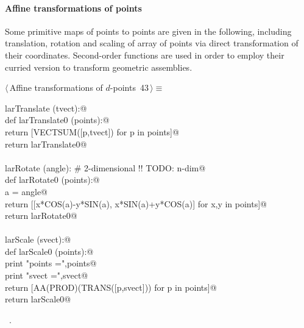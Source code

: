 \documentclass[11pt,oneside]{article}    %
\begin{document}
\paragraph{Affine transformations of points} Some primitive maps of points to points are given in the following, including translation, rotation and scaling of array of points via direct transformation of their coordinates. Second-order functions are used in order to employ their curried version to transform geometric assemblies.

\begin{flushleft} \small \label{scrap69}
\protect{}$\langle\,$Affine transformations of $d$-points\nobreak\ {\footnotesize 43}$\,\rangle\equiv$
\vspace{-1ex}
\begin{list}{}{} \item
\mbox{}\verb@def larTranslate (tvect):@\\
\mbox{}\verb@    def larTranslate0 (points):@\\
\mbox{}\verb@        return [VECTSUM([p,tvect]) for p in points]@\\
\mbox{}\verb@    return larTranslate0@\\
\mbox{}\verb@@\\
\mbox{}\verb@def larRotate (angle):        # 2-dimensional !! TODO: n-dim@\\
\mbox{}\verb@    def larRotate0 (points):@\\
\mbox{}\verb@        a = angle@\\
\mbox{}\verb@        return [[x*COS(a)-y*SIN(a), x*SIN(a)+y*COS(a)] for x,y in points]@\\
\mbox{}\verb@    return larRotate0@\\
\mbox{}\verb@@\\
\mbox{}\verb@def larScale (svect):@\\
\mbox{}\verb@    def larScale0 (points):@\\
\mbox{}\verb@        print "\n points =",points@\\
\mbox{}\verb@        print "\n svect =",svect@\\
\mbox{}\verb@        return [AA(PROD)(TRANS([p,svect])) for p in points]@\\
\mbox{}\verb@    return larScale0@\\
\mbox{}\verb@@{\NWsep}
\end{list}
\vspace{-1ex}
\footnotesize\addtolength{\baselineskip}{-1ex}
\begin{list}{}{\setlength{\itemsep}{-\parsep}\setlength{\itemindent}{-\leftmargin}}
\item \NWtxtMacroRefIn\ .
\end{list}
\end{flushleft}
\end{document}
